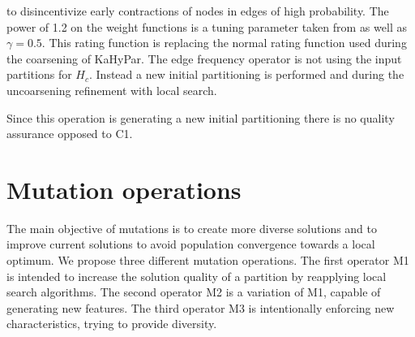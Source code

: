 \documentclass[a4paper,12pt,titlepage, BCOR7mm,headsepline]{scrbook}
\numberwithin{equation}{section}
\begin{document}
to disincentivize early contractions of nodes in edges of high probability. The power of 1.2 on the weight functions is a tuning parameter taken from \cite{delling2011graph} as well as $\gamma = 0.5$.
This rating function is replacing the normal rating function used during the coarsening of KaHyPar. 
The edge frequency operator is not using the input partitions for $H_c$. Instead a new initial partitioning is performed and during the uncoarsening refinement with local search.

Since this operation is generating a new initial partitioning there is no quality assurance opposed to C1.
\section{Mutation operations}
The main objective of mutations is to create more diverse solutions and to improve current solutions to avoid population convergence towards a local optimum.
We propose three different mutation operations. The first operator M1 is intended to increase the solution quality of a partition by reapplying local search algorithms. The second operator M2 is a variation of M1, capable of generating new features. The third operator M3 is intentionally enforcing new characteristics, trying to provide diversity.



\end{document}
